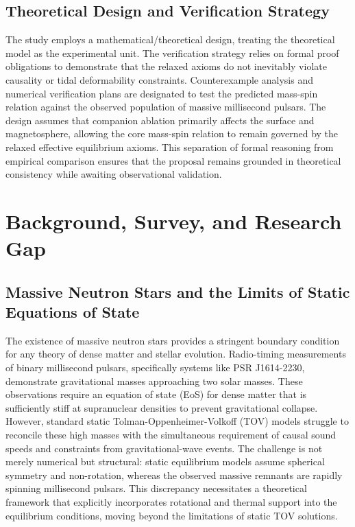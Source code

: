 \documentclass[conference]{IEEEtran}
\begin{document}
\subsection{Theoretical Design and Verification Strategy}
The study employs a mathematical/theoretical design, treating the theoretical model as the experimental unit. The verification strategy relies on formal proof obligations to demonstrate that the relaxed axioms do not inevitably violate causality or tidal deformability constraints. Counterexample analysis and numerical verification plans are designated to test the predicted mass-spin relation against the observed population of massive millisecond pulsars. The design assumes that companion ablation primarily affects the surface and magnetosphere, allowing the core mass-spin relation to remain governed by the relaxed effective equilibrium axioms. This separation of formal reasoning from empirical comparison ensures that the proposal remains grounded in theoretical consistency while awaiting observational validation.

\section{Background, Survey, and Research Gap}
\subsection{Massive Neutron Stars and the Limits of Static Equations of State}
The existence of massive neutron stars provides a stringent boundary condition for any theory of dense matter and stellar evolution. Radio-timing measurements of binary millisecond pulsars, specifically systems like PSR J1614-2230, demonstrate gravitational masses approaching two solar masses. These observations require an equation of state (EoS) for dense matter that is sufficiently stiff at supranuclear densities to prevent gravitational collapse. However, standard static Tolman-Oppenheimer-Volkoff (TOV) models struggle to reconcile these high masses with the simultaneous requirement of causal sound speeds and constraints from gravitational-wave events. The challenge is not merely numerical but structural: static equilibrium models assume spherical symmetry and non-rotation, whereas the observed massive remnants are rapidly spinning millisecond pulsars. This discrepancy necessitates a theoretical framework that explicitly incorporates rotational and thermal support into the equilibrium conditions, moving beyond the limitations of static TOV solutions.~\cite{cite_42e341ff6471ce89,cite_55957f4ce67bd972}
\end{document}
